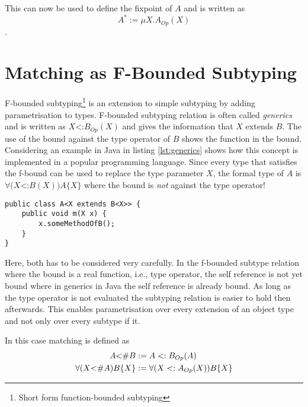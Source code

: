 This can now be used to define the fixpoint of $A$ and is written as \[A^*
:= \mu X.A_{Op}(X)\].

\section{Matching as F-Bounded Subtyping}
F-bounded subtyping\footnote{Short form function-bounded subtyping}
is an extension to simple subtyping by adding parametrisation to
types. F-bounded subtyping relation is often called \emph{generics}
and is written as $X$<:$B_{Op}(X)$ and gives the information that $X$
extends $B$. The use of the bound against the type operator of $B$
shows the function in the bound. Considering an example in Java in
listing \ref{lst:generics} shows how this concept is implemented in a popular
programming language. Since every type that satisfies the f-bound can
be used to replace the type parameter $X$, the formal type of $A$ is
$\forall(X$<:$B(X))A\{X\}$ where the bound is \emph{not} against the 
type operator!

\begin{lstlisting}[float,caption={Universal quantified f-bound in Java},label={lst:generics}]
public class A<X extends B<X>> {
	public void m(X x) {
		x.someMethodOfB();
	}
}
\end{lstlisting}

Here, both has to be considered very carefully. In the f-bounded subtype
relation where the bound is a real function, i.e., type operator,
the self reference is not yet bound where in generics in Java the self
reference is already bound. As long as the type operator is not evaluated
the subtyping relation is easier to hold then afterwards. This enables 
parametrisation over every extension of an object type and not only over
every subtype if it.

In this case matching is defined as\cite{abadi_subtyping_1996}
\begin{align*}
	A \textnormal{<\#} B & := A <: B_{Op}(A) \\
	\forall (X \textnormal{<\#} A)B\{X\} & := \forall (X <: A_{Op}(X))B\{X\}
\end{align*}

%

